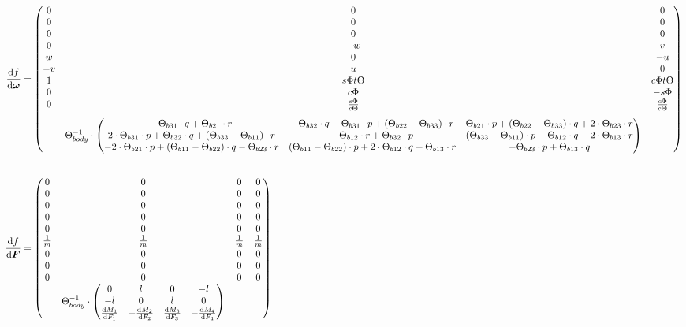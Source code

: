 \begin{align*}
	\frac{\text{d}f}{\text{d} \boldsymbol{\omega}} &= \begin{pmatrix} 
		0 & 0 & 0 
	\\
		0 & 0 & 0
	\\
		0 & 0 & 0
	\\
		0 & -w & v
	\\
		w & 0 & -u
	\\
		-v & u & 0
	\\
		1 & s{\Phi} t\Theta  & c{\Phi} t\Theta
	\\
		0 & c{\Phi} & -s{\Phi}
	\\
		0 & \frac{s{\Phi}}{c{\Theta}} & \frac{c{\Phi}}{c{\Theta}}
	\\[0.8em]
		&\Theta_{body}^{-1} \cdot \begin{pmatrix}
			-\Theta_{b31} \cdot q + \Theta_{b21}\cdot r & 
			-\Theta_{b32} \cdot q -\Theta_{b31} \cdot p + (\Theta_{b22} - \Theta_{b33})\cdot r  & 
			\Theta_{b21}\cdot p + (\Theta_{b22}-\Theta_{b33})\cdot q + 2\cdot \Theta_{b23}\cdot r
			\\
			2\cdot \Theta_{b31}\cdot p + \Theta_{b32}\cdot q + (\Theta_{b33}-\Theta_{b11})\cdot r & 
			-\Theta_{b12} \cdot r +\Theta_{b32} \cdot p & 
			(\Theta_{b33}-\Theta_{b11})\cdot p - \Theta_{b12}\cdot q - 2\cdot\Theta_{b13}\cdot r 
			\\
			-2\cdot \Theta_{b21} \cdot p + (\Theta_{b11}- \Theta_{b22})\cdot q - \Theta_{b23}\cdot r &  
			(\Theta_{b11}-\Theta_{b22})\cdot p + 2\cdot \Theta_{b12}\cdot q + \Theta_{b13}\cdot r &
			-\Theta_{b23} \cdot p +\Theta_{b13} \cdot q
		\end{pmatrix}
	\end{pmatrix}	
	\\[2em]
	\frac{\text{d}f}{\text{d} \boldsymbol{F}} &= 
	\begin{pmatrix} 
		0 & 0 & 0 & 0 \\
		0 & 0 & 0 & 0 \\
		0 & 0 & 0 & 0 \\
		0 & 0 & 0 & 0 \\
		0 & 0 & 0 & 0 \\
		\frac{1}{m} & \frac{1}{m} & \frac{1}{m} & \frac{1}{m} \\[0.2em]
		0 & 0 & 0 & 0 \\
		0 & 0 & 0 & 0 \\
		0 & 0 & 0 & 0 \\
		 & \Theta_{body}^{-1} \cdot \begin{pmatrix}
		 	0 & l & 0 & -l \\
		 	-l & 0 &  l & 0 \\
		 	\frac{\text{d}M_1}{\text{d}F_1} & -\frac{\text{d}M_2}{\text{d}F_2} & \frac{\text{d}M_3}{\text{d}F_3} & -\frac{\text{d}M_4}{\text{d}F_4}
		 \end{pmatrix}
	\end{pmatrix}
\end{align*}


